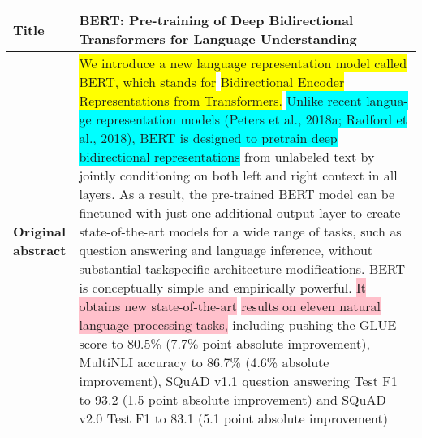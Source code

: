 \documentclass[11pt]{article}
\begin{document}
\begin{table*}[ht]
\centering
\begin{tabularx}{\linewidth}{l|X}
\toprule 
\textbf{Title} & BERT: Pre-training of Deep Bidirectional Transformers for Language Understanding\\ \midrule
\shortstack{\textbf{Original}\\\textbf{abstract}} & \colorbox{yellow}{We introduce a new language representation model called BERT, which stands for} \colorbox{yellow}{Bidirectional Encoder Representations from Transformers.} \colorbox{cyan}{Unlike recent langua-} \colorbox{cyan}{ge representation models (Peters et al., 2018a; Radford et al., 2018), BERT is } \colorbox{cyan}{designed to pretrain deep bidirectional representations} from unlabeled text by jointly conditioning on both left and right context in all layers. As a result, the pre-trained BERT model can be finetuned with just one additional output layer to create state-of-the-art models for a wide range of tasks, such as question answering and language inference, without substantial taskspecific architecture modifications. BERT is conceptually simple and empirically powerful. \colorbox{pink}{It obtains new state-of-the-art} \colorbox{pink}{results on eleven natural language processing tasks,} including pushing the GLUE score to 80.5\% (7.7\% point absolute improvement), MultiNLI accuracy to 86.7\% (4.6\% absolute improvement), SQuAD v1.1 question answering Test F1 to 93.2 (1.5 point absolute improvement) and SQuAD v2.0 Test F1 to 83.1 (5.1 point absolute improvement)\\ \midrule


\end{tabularx}
\end{table*}
\end{document}
